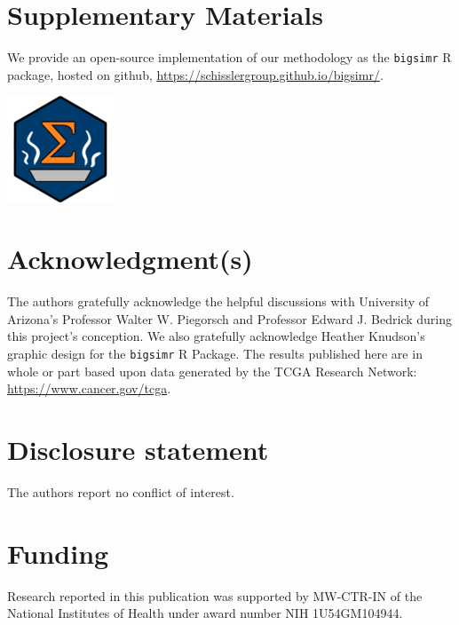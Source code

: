 \documentclass[]{article}
\begin{document}
\hypertarget{misc}{%
\section*{Supplementary Materials}\label{misc}}

We provide an open-source implementation of our methodology as the \texttt{bigsimr} R package, hosted on github, \url{https://schisslergroup.github.io/bigsimr/}.

\begin{center}\includegraphics[width=0.05\linewidth]{images/hex-bigsimr} \end{center}

\hypertarget{acknowledgments}{%
\section*{Acknowledgment(s)}\label{acknowledgments}}

The authors gratefully acknowledge the helpful discussions with University of Arizona's Professor Walter W. Piegorsch and Professor Edward J. Bedrick during this project's conception.
We also gratefully acknowledge Heather Knudson's graphic design for the \texttt{bigsimr} R Package.
The results published here are in whole or part based upon data generated by the TCGA Research Network: \url{https://www.cancer.gov/tcga}.

\hypertarget{coi}{%
\section*{Disclosure statement}\label{coi}}

The authors report no conflict of interest.

\hypertarget{funding}{%
\section*{Funding}\label{funding}}

Research reported in this publication was supported by MW-CTR-IN of the National Institutes of Health under award number NIH 1U54GM104944.


\end{document}
